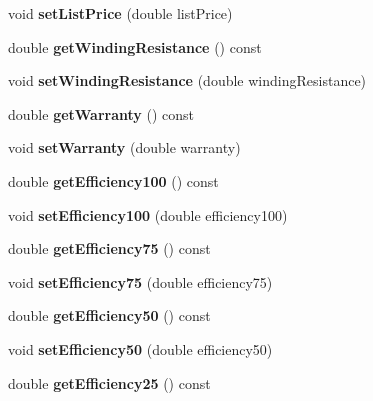 \begin{DoxyCompactItemize}
void {\bfseries set\+List\+Price} (double list\+Price)
\item 
\mbox{\label{class_motor_data_a4ce68beb85d4b904e173c2570c04846b}} 
double {\bfseries get\+Winding\+Resistance} () const
\item 
\mbox{\label{class_motor_data_a4dd9a4f231dc0fce6ba8a780bf5d7796}} 
void {\bfseries set\+Winding\+Resistance} (double winding\+Resistance)
\item 
\mbox{\label{class_motor_data_a3d0da64855a76a96e17bedb9b94aa5a7}} 
double {\bfseries get\+Warranty} () const
\item 
\mbox{\label{class_motor_data_affd407ad3b6e18b3c611b5c82a986737}} 
void {\bfseries set\+Warranty} (double warranty)
\item 
\mbox{\label{class_motor_data_af71f431074380c5251522ea0a30dd450}} 
double {\bfseries get\+Efficiency100} () const
\item 
\mbox{\label{class_motor_data_a61ba89edc6ec243f8012a11aaed5eaa9}} 
void {\bfseries set\+Efficiency100} (double efficiency100)
\item 
\mbox{\label{class_motor_data_a953c733a4409ff686329e2bb89c1af8a}} 
double {\bfseries get\+Efficiency75} () const
\item 
\mbox{\label{class_motor_data_afccbaa43b470f6576647851cc9d356d6}} 
void {\bfseries set\+Efficiency75} (double efficiency75)
\item 
\mbox{\label{class_motor_data_a07d861b745f8d2a09c8e7540a6fe65ed}} 
double {\bfseries get\+Efficiency50} () const
\item 
\mbox{\label{class_motor_data_aad6febd24d17e5f9cfc829666cb3c3a2}} 
void {\bfseries set\+Efficiency50} (double efficiency50)
\item 
\mbox{\label{class_motor_data_a9da44e426e9a386a5d16e1ccffa3f8a1}} 
double {\bfseries get\+Efficiency25} () const
\item 

\end{DoxyCompactItemize}
